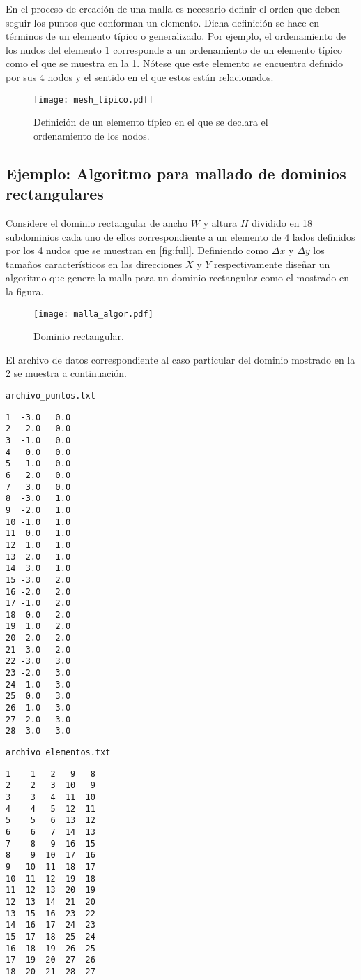 En el proceso de creación de una malla es necesario definir el orden que deben seguir los puntos que conforman un elemento. Dicha definición se hace en términos de un elemento típico o generalizado. Por ejemplo, el ordenamiento de los nudos del elemento $1$ corresponde a un ordenamiento de un elemento típico como el que se muestra en la \cref{fig:tipico}. Nótese que este elemento se encuentra definido por sus 4 nodos y el sentido en el que estos están relacionados.
\begin{figure}[H]
\centering
\texttt{[image: mesh\_tipico.pdf]}
\caption{Definición de un elemento típico en el que se declara el ordenamiento de los nodos.}
\label{fig:tipico}
\end{figure}

\pagebreak
\subsection{Ejemplo: Algoritmo para mallado de dominios rectangulares}
Considere el dominio rectangular de ancho $W$ y altura $H$ dividido en 18 subdominios cada uno de ellos correspondiente a un elemento de 4 lados definidos por los 4 nudos que se muestran en \cref{fig:full}. Definiendo como $\Delta x$ y $\Delta y$ los tamaños característicos en las direcciones $X$ y $Y$ respectivamente diseñar un algoritmo que genere la malla para un dominio rectangular como el mostrado en la figura.
\begin{figure}[H]
\centering
\texttt{[image: malla\_algor.pdf]}
\caption{Dominio rectangular.}
\label{fig:malla_algor}
\end{figure}

El archivo de datos correspondiente al caso particular del dominio mostrado en la \cref{fig:malla_algor} se muestra a continuación.
\begin{center}
\begin{minipage}[t]{0.3\textwidth}
\texttt{archivo\_puntos.txt}
\small
\begin{verbatim}
1  -3.0   0.0
2  -2.0   0.0
3  -1.0   0.0
4   0.0   0.0
5   1.0   0.0
6   2.0   0.0
7   3.0   0.0
8  -3.0   1.0
9  -2.0   1.0
10 -1.0   1.0
11  0.0   1.0
12  1.0   1.0
13  2.0   1.0
14  3.0   1.0
15 -3.0   2.0
16 -2.0   2.0
17 -1.0   2.0
18  0.0   2.0
19  1.0   2.0
20  2.0   2.0
21  3.0   2.0
22 -3.0   3.0
23 -2.0   3.0
24 -1.0   3.0
25  0.0   3.0
26  1.0   3.0
27  2.0   3.0
28  3.0   3.0
\end{verbatim}
\end{minipage}
\begin{minipage}[t]{0.3\textwidth}
\texttt{archivo\_elementos.txt}
\small
\begin{verbatim}
1    1   2   9   8
2    2   3  10   9
3    3   4  11  10
4    4   5  12  11
5    5   6  13  12
6    6   7  14  13
7    8   9  16  15
8    9  10  17  16
9   10  11  18  17
10  11  12  19  18
11  12  13  20  19
12  13  14  21  20
13  15  16  23  22
14  16  17  24  23
15  17  18  25  24
16  18  19  26  25
17  19  20  27  26
18  20  21  28  27
\end{verbatim}
\end{minipage}
\end{center}


